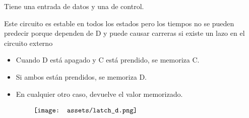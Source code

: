 \documentclass[10pt,a4paper]{article}
\begin{document}
Tiene una entrada de datos y una de control.

Este circuito es estable en todos los estados pero los tiempos no se pueden predecir porque dependen de D y puede causar carreras si existe un lazo en el circuito externo

\begin{itemize}
    \item Cuando D está apagado y C está prendido, se memoriza C.
    \item Si ambos están prendidos, se memoriza D.
    \item En cualquier otro caso, devuelve el valor memorizado.
\end{itemize}

\[\begin{minipage}[b]{0.8\textwidth}
    \texttt{[image: assets/latch\_d.png]}
    \label{fig:latch_d}
\end{minipage}\]
\end{document}
